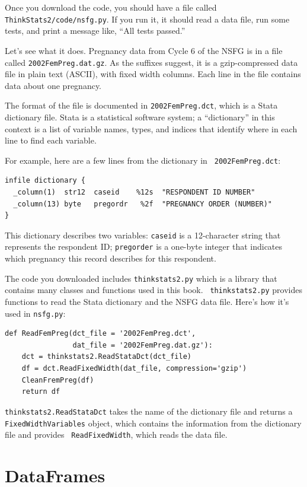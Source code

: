\documentclass[12pt]{book}
\begin{document}
Once you download the code, you should have a file called {\tt
  ThinkStats2/code/nsfg.py}.  If you run it, it should read a data
file, run some tests, and print a message like, ``All tests passed.''

Let's see what it does.  Pregnancy data from Cycle 6 of the NSFG is in
a file called {\tt 2002FemPreg.dat.gz}.  As the suffixes suggest, it
is a gzip-compressed data file in plain text (ASCII), with fixed width
columns.  Each line in the file contains data about one pregnancy.

The format of the file is documented in {\tt 2002FemPreg.dct}, which
is a Stata dictionary file.  Stata is a statistical software system;
a ``dictionary'' in this context is a list of variable names, types,
and indices that identify where in each line to find each variable.

For example, here are a few lines from the dictionary in {\tt
  2002FemPreg.dct}:
%
\begin{verbatim}
infile dictionary {
  _column(1)  str12  caseid    %12s  "RESPONDENT ID NUMBER"
  _column(13) byte   pregordr   %2f  "PREGNANCY ORDER (NUMBER)"
}
\end{verbatim}

This dictionary describes two variables: {\tt caseid} is a 12-character
string that represents the respondent ID; {\tt pregorder} is a 
one-byte integer that indicates which pregnancy this record
describes for this respondent.

The code you downloaded includes {\tt thinkstats2.py} which is a library
that contains many classes and functions used in this book.  {\tt
  thinkstats2.py} provides functions to read the Stata dictionary and
the NSFG data file.  Here's how it's used in {\tt nsfg.py}:

\begin{verbatim}
def ReadFemPreg(dct_file = '2002FemPreg.dct',
                dat_file = '2002FemPreg.dat.gz'):
    dct = thinkstats2.ReadStataDct(dct_file)
    df = dct.ReadFixedWidth(dat_file, compression='gzip')
    CleanFremPreg(df)
    return df
\end{verbatim}

{\tt thinkstats2.ReadStataDct} takes the name of the dictionary file
and returns a {\tt FixedWidthVariables} object, which contains the
information from the dictionary file and provides {\tt
  ReadFixedWidth}, which reads the data file.


\section{DataFrames}
\end{document}
